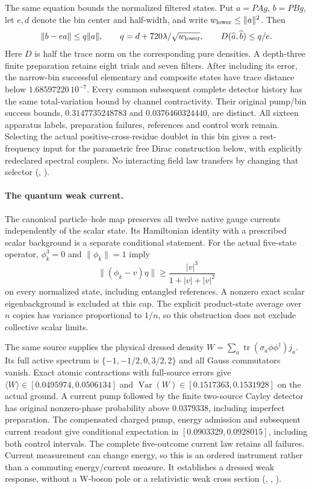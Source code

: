 The same equation bounds the normalized filtered states. Put
$a=PAg$, $b=PBg$, let $e,d$ denote the bin center and half-width, and
write $w_{\rm lower}\le\|a\|^2$. Then
\[
 \|b-ea\|\le q\|a\|,\qquad
 q=d+720\lambda/\sqrt{w_{\rm lower}},\qquad
 D(\widehat a,\widehat b)\le q/e.
\]
Here $D$ is half the trace norm on the corresponding pure densities.
A depth-three finite preparation retains eight trials and seven filters.
After including its error, the narrow-bin successful elementary and
composite states have trace distance below $1.68597220\,10^{-7}$.
Every common subsequent complete detector history has the same
total-variation bound by channel contractivity. Their original pump/bin
success bounds, $0.3147735248783$ and $0.0376460324440$, are distinct.
All sixteen apparatus labels, preparation failures, references and control
work remain. Selecting the actual positive-cross-residue doublet in this
bin gives a rest-frequency input for the parametric free Dirac construction
below, with explicitly redeclared spectral couplers. No interacting
field law transfers by changing that selector
(, \cite{ophrepo}).

\paragraph{The quantum weak current.}
The canonical particle--hole map preserves all twelve native gauge
currents independently of the scalar state. Its Hamiltonian identity
with a prescribed scalar background is a separate conditional statement.
For the actual five-state operator, $\phi_k^3=0$ and $\|\phi_k\|=1$ imply
\[
 \| (\phi_k-v)\eta\|\ge
 \frac{|v|^3}{1+|v|+|v|^2}
\]
on every normalized state, including entangled references. A nonzero
exact scalar eigenbackground is excluded at this cap. The explicit
product-state average over $n$ copies has variance proportional to $1/n$,
so this obstruction does not exclude collective scalar limits.

The same source supplies the physical dressed density
$W=\sum_a\operatorname{tr}(\sigma_a\phi\phi^\dagger)j_a$.
Its full active spectrum is $\{-1,-1/2,0,3/2,2\}$ and all Gauss
commutators vanish. Exact atomic contractions with full-source errors
give $\langle W\rangle\in[0.0495974,0.0506134]$ and
$\operatorname{Var}(W)\in[0.1517363,0.1531928]$ on the actual ground.
A current pump followed by the finite two-source Cayley detector has
original nonzero-phase probability above $0.0379338$, including imperfect
preparation. The compensated charged pump, energy admission and subsequent
current readout give conditional expectation in
$[0.0903329,0.0928015]$, including both control intervals. The complete
five-outcome current law retains all failures. Current measurement
can change energy, so this is an ordered instrument rather than a
commuting energy/current measure. It establishes a dressed weak response,
without a W-boson pole or a relativistic weak cross section
(,
, \cite{ophrepo}).

